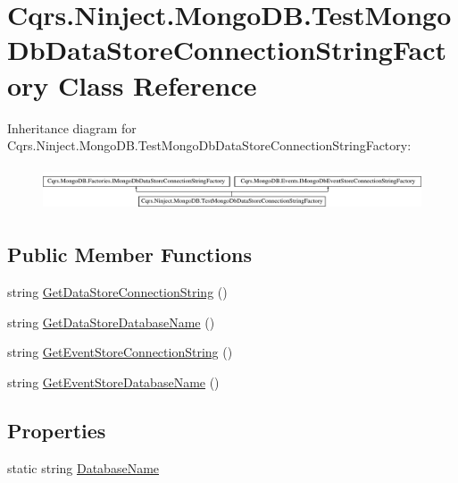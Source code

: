 \hypertarget{classCqrs_1_1Ninject_1_1MongoDB_1_1TestMongoDbDataStoreConnectionStringFactory}{}\section{Cqrs.\+Ninject.\+Mongo\+D\+B.\+Test\+Mongo\+Db\+Data\+Store\+Connection\+String\+Factory Class Reference}
\label{classCqrs_1_1Ninject_1_1MongoDB_1_1TestMongoDbDataStoreConnectionStringFactory}
Inheritance diagram for Cqrs.\+Ninject.\+Mongo\+D\+B.\+Test\+Mongo\+Db\+Data\+Store\+Connection\+String\+Factory\+:\begin{figure}[H]
\begin{center}
\leavevmode
\includegraphics[height=1.308411cm]{classCqrs_1_1Ninject_1_1MongoDB_1_1TestMongoDbDataStoreConnectionStringFactory}
\end{center}
\end{figure}
\subsection*{Public Member Functions}
\begin{DoxyCompactItemize}
\item 
string \hyperlink{classCqrs_1_1Ninject_1_1MongoDB_1_1TestMongoDbDataStoreConnectionStringFactory_abc9f81219c65af4182635cd545282b65}{Get\+Data\+Store\+Connection\+String} ()
\item 
string \hyperlink{classCqrs_1_1Ninject_1_1MongoDB_1_1TestMongoDbDataStoreConnectionStringFactory_a9ef0515d08d9a309fcfef00b15dad8cf}{Get\+Data\+Store\+Database\+Name} ()
\item 
string \hyperlink{classCqrs_1_1Ninject_1_1MongoDB_1_1TestMongoDbDataStoreConnectionStringFactory_a3dcdc2262f3a39be8fdba16a6d09c523}{Get\+Event\+Store\+Connection\+String} ()
\item 
string \hyperlink{classCqrs_1_1Ninject_1_1MongoDB_1_1TestMongoDbDataStoreConnectionStringFactory_ae34e14a01ee79e427a87b6ef2c220288}{Get\+Event\+Store\+Database\+Name} ()
\end{DoxyCompactItemize}
\subsection*{Properties}
\begin{DoxyCompactItemize}
\item 
static string \hyperlink{classCqrs_1_1Ninject_1_1MongoDB_1_1TestMongoDbDataStoreConnectionStringFactory_a53412e87f2114b8a61d6898f7f290187}{Database\+Name}
\end{DoxyCompactItemize}



